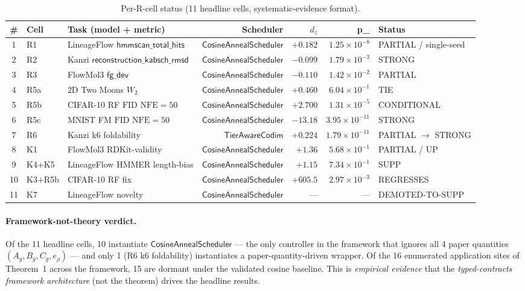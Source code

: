 \documentclass[journal,twocolumn,final]{IEEEtran}
\newcommand{\NFE}{\mathrm{NFE}}
\newcommand{\pbonf}{p_{\mathrm{bonf}}}
\newcommand{\dz}{d_z}
\newcommand{\egap}{e_\rho}
\newcommand{\sheetA}{A_g}
\newcommand{\sheetB}{B_g}
\newcommand{\sheetC}{C_g}
\newcommand{\wftwo}{W_2}
\newcommand{\FID}{\mathrm{FID}}
\begin{document}
\begin{table}[ht]
\centering
\caption{Per-R-cell status (11 headline cells, systematic-evidence format).}
\label{tab:status}
\small
\begin{tabular}{cllrrrl}
\toprule
\# & \textbf{Cell} & \textbf{Task (model + metric)} & \textbf{Scheduler} & $\dz$ & \pbonf & \textbf{Status} \\
\midrule
1 & R1  & LineageFlow $\mathsf{hmmscan\_total\_hits}$ & $\mathsf{CosineAnnealScheduler}$ & $+0.182$  & $1.25\!\times\!10^{-8}$  & PARTIAL / single-seed \\
2 & R2  & Kanzi $\mathsf{reconstruction\_kabsch\_rmsd}$ & $\mathsf{CosineAnnealScheduler}$ & $-0.099$  & $1.79\!\times\!10^{-3}$  & STRONG \\
3 & R3  & FlowMol3 $\mathsf{fg\_dev}$                & $\mathsf{CosineAnnealScheduler}$ & $-0.110$  & $1.42\!\times\!10^{-2}$  & PARTIAL \\
4 & R5a & 2D Two Moons $\wftwo$                       & $\mathsf{CosineAnnealScheduler}$ & $+0.460$  & $6.04\!\times\!10^{-1}$  & TIE \\
5 & R5b & CIFAR-10 RF $\FID$ $\NFE=50$                & $\mathsf{CosineAnnealScheduler}$ & $+2.700$  & $1.31\!\times\!10^{-5}$  & CONDITIONAL \\
6 & R5c & MNIST FM $\FID$ $\NFE=50$                   & $\mathsf{CosineAnnealScheduler}$ & $-13.18$  & $3.95\!\times\!10^{-11}$ & STRONG \\
7 & R6  & Kanzi k6 foldability                        & $\mathsf{TierAwareCodim}$         & $+0.224$  & $1.79\!\times\!10^{-11}$ & PARTIAL $\to$ STRONG \\
8 & K1  & FlowMol3 RDKit-validity                     & $\mathsf{CosineAnnealScheduler}$ & $+1.36$   & $5.68\!\times\!10^{-1}$  & PARTIAL / UP \\
9 & K4+K5 & LineageFlow HMMER length-bias             & $\mathsf{CosineAnnealScheduler}$ & $+1.15$   & $7.34\!\times\!10^{-1}$  & SUPP \\
10 & K3+R5b & CIFAR-10 RF fix                        & $\mathsf{CosineAnnealScheduler}$ & $+605.5$  & $2.97\!\times\!10^{-3}$  & REGRESSES \\
11 & K7  & LineageFlow novelty                         & $\mathsf{CosineAnnealScheduler}$ & ---        & ---                       & DEMOTED-TO-SUPP \\
\bottomrule
\end{tabular}
\end{table}

\paragraph{Framework-not-theory verdict.}
Of the 11 headline cells, 10 instantiate $\mathsf{CosineAnnealScheduler}$ ---
the only controller in the framework that ignores all 4 paper quantities
$(\sheetA, \sheetB, \sheetC, \egap)$ --- and only 1 (R6 k6 foldability)
instantiates a paper-quantity-driven wrapper. Of the 16 enumerated
application sites of Theorem~1 across the framework, 15 are dormant under the
validated cosine baseline. This is \emph{empirical evidence} that the
\emph{typed-contracts framework architecture} (not the theorem) drives the
headline results.
\end{document}
